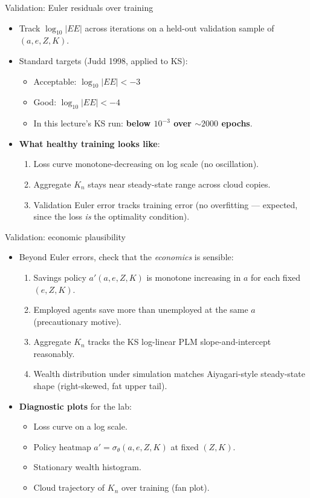 \begin{frame}{Validation: Euler residuals over training}
\begin{itemize}
\item Track $\log_{10}\!|EE|$ across iterations on a held-out validation sample of $(a, e, Z, K)$.
\medskip
\item Standard targets (Judd 1998, applied to KS):
  \begin{itemize}
  \item Acceptable: $\log_{10}|EE| < -3$
  \item Good: $\log_{10}|EE| < -4$
  \item In this lecture's KS run: \textbf{below $10^{-3}$ over $\sim 2000$ epochs}.
  \end{itemize}
\medskip
\item \textbf{What healthy training looks like}:
  \begin{enumerate}
  \item Loss curve monotone-decreasing on log scale (no oscillation).
  \item Aggregate $K_n$ stays near steady-state range across cloud copies.
  \item Validation Euler error tracks training error (no overfitting --- expected, since the loss \emph{is} the optimality condition).
  \end{enumerate}
\end{itemize}
\end{frame}

\begin{frame}{Validation: economic plausibility}
\begin{itemize}
\item Beyond Euler errors, check that the \emph{economics} is sensible:
  \begin{enumerate}
  \item Savings policy $a'(a, e, Z, K)$ is monotone increasing in $a$ for each fixed $(e, Z, K)$.
  \item Employed agents save more than unemployed at the same $a$ (precautionary motive).
  \item Aggregate $K_n$ tracks the KS log-linear PLM slope-and-intercept reasonably.
  \item Wealth distribution under simulation matches Aiyagari-style steady-state shape (right-skewed, fat upper tail).
  \end{enumerate}
\medskip
\item \textbf{Diagnostic plots} for the lab:
  \begin{itemize}
  \item Loss curve on a log scale.
  \item Policy heatmap $a' = \sigma_\theta(a, e, Z, K)$ at fixed $(Z, K)$.
  \item Stationary wealth histogram.
  \item Cloud trajectory of $K_n$ over training (fan plot).
  \end{itemize}
\end{itemize}
\end{frame}

